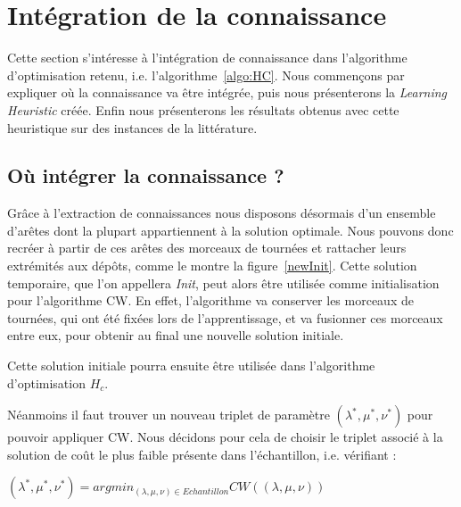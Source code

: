 \documentclass[a4paper,11pt]{article}%
\begin{document}
\section{Intégration de la connaissance} 
\label{Integration}
Cette section s'intéresse à l'intégration de connaissance dans l'algorithme d'optimisation retenu, i.e. l'algorithme~\ref{algo:HC}. 
Nous commençons par expliquer où la connaissance va être intégrée, puis nous présenterons la \emph{Learning Heuristic} créée. Enfin nous présenterons les résultats obtenus avec cette heuristique sur des instances de la littérature.

\subsection{Où intégrer la connaissance ?}
Grâce à l'extraction de connaissances nous disposons désormais d'un ensemble d'arêtes dont la plupart appartiennent à la solution optimale. 
Nous pouvons donc recréer à partir de ces arêtes des morceaux de tournées et rattacher leurs extrémités aux dépôts, comme le montre la figure~\ref{newInit}.
Cette solution temporaire, que l'on appellera \emph{Init}, peut alors être utilisée comme initialisation pour l'algorithme CW.
En effet, l'algorithme va conserver les morceaux de tournées, qui ont été fixées lors de l'apprentissage, et va fusionner ces morceaux entre eux, pour obtenir au final une nouvelle solution initiale.

Cette solution initiale pourra ensuite être utilisée dans l'algorithme d'optimisation $H_c$.

Néanmoins il faut trouver un nouveau triplet de paramètre $(\lambda^*,\mu^*,\nu^*)$ pour pouvoir appliquer CW. Nous décidons pour cela de choisir le triplet associé à la solution de coût le plus faible présente dans l'échantillon, i.e. vérifiant :
\begin{center}
$(\lambda^*,\mu^*,\nu^*) = argmin_{(\lambda,\mu,\nu) \in Echantillon} CW((\lambda,\mu,\nu))$
\end{center}
\end{document}
